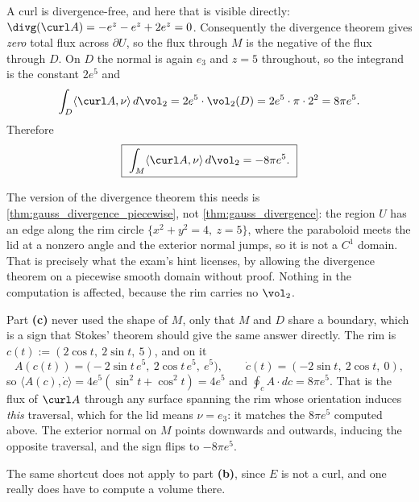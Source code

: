 \begin{exercisesolution}
\begin{enumerate}[label=\textbf{(\alph*)}]
    A curl is divergence-free, and here that is visible directly:
    $\divg(\curl A) = -e^z - e^z + 2e^z = 0$. Consequently the divergence theorem gives
    \emph{zero} total flux across $\partial U$, so the flux through $M$ is the negative of the flux
    through $D$. On $D$ the normal is again $e_3$ and $z = 5$ throughout, so the integrand is the
    constant $2e^5$ and
    \[\int_D \langle \curl A,\nu\rangle\,d\vol_2 = 2e^5 \cdot \vol_2(D) = 2e^5\cdot\pi\cdot 2^2
      = 8\pi e^5 .\]
    Therefore
    \[\boxed{\ \int_M \langle \curl A,\nu\rangle\,d\vol_2 = -8\pi e^5.\ }\]
\end{enumerate}
\begin{ainote}
The version of the divergence theorem this needs is \cref{thm:gauss_divergence_piecewise}, not
\cref{thm:gauss_divergence}: the region $U$ has an edge along the rim circle
$\{x^2+y^2=4,\ z=5\}$, where the paraboloid meets the lid at a nonzero angle and the exterior
normal jumps, so it is not a $C^1$ domain. That is precisely what the exam's hint licenses, by
allowing the divergence theorem on a piecewise smooth domain without proof. Nothing in the
computation is affected, because the rim carries no $\vol_2$.
\end{ainote}
\begin{remark}
Part \textbf{(c)} never used the shape of $M$, only that $M$ and $D$ share a boundary, which is a
sign that Stokes' theorem should give the same answer directly. The rim is
$c(t) := (2\cos t,\ 2\sin t,\ 5)$, and on it
\[A(c(t)) = \big(-2\sin t\,e^5,\ 2\cos t\,e^5,\ e^5\big), \qquad
  \dot c(t) = (-2\sin t,\ 2\cos t,\ 0),\]
so $\langle A(c),\dot c\rangle = 4e^5(\sin^2 t + \cos^2 t) = 4e^5$ and
$\oint_c A\cdot dc = 8\pi e^5$. That is the flux of $\curl A$ through any surface spanning the rim
whose orientation induces \emph{this} traversal, which for the lid means $\nu = e_3$: it matches
the $8\pi e^5$ computed above. The exterior normal on $M$ points downwards and outwards, inducing
the opposite traversal, and the sign flips to $-8\pi e^5$.

The same shortcut does not apply to part \textbf{(b)}, since $E$ is not a curl, and one really does
have to compute a volume there.
\end{remark}
\end{exercisesolution}

